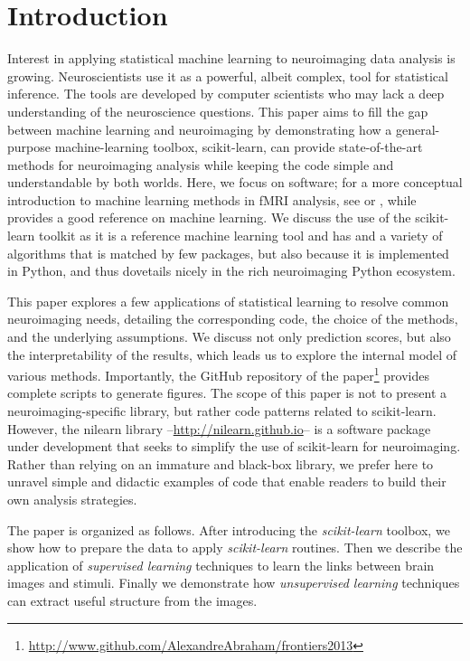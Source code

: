 \documentclass{frontiersSCNS} %
\begin{document}
\section{Introduction}
Interest in applying statistical machine learning to neuroimaging data analysis
is growing. Neuroscientists use it as a powerful, albeit complex, tool for
statistical inference. The tools are developed by
computer scientists who may lack a deep understanding of the
neuroscience questions. This paper
aims to fill the gap between machine learning and neuroimaging by demonstrating
how a general-purpose machine-learning toolbox, scikit-learn, can
provide state-of-the-art methods for neuroimaging analysis while keeping
the code simple and
understandable by both worlds. Here, we focus on software; for a 
more conceptual introduction to machine learning methods in fMRI analysis,
see \cite{pereira2009} or \cite{mur2009}, while \cite{hastie2001}
provides a good reference on machine learning.
We discuss the use of the scikit-learn toolkit as it is a reference
machine learning tool and has and a variety of algorithms that is matched by few
packages,
but also because it is implemented in Python,
and thus dovetails nicely in the rich neuroimaging Python ecosystem.

This paper explores a few applications of statistical learning to
resolve common neuroimaging needs, detailing the corresponding code,
the choice of the methods, and the underlying assumptions. We discuss not only
prediction scores, but also the interpretability of the results, which
leads us to explore the internal model of various methods. 
Importantly, the GitHub repository of the
paper\footnote{\url{http://www.github.com/AlexandreAbraham/frontiers2013}}
provides complete scripts to generate figures. 
The scope of this paper is not to present a neuroimaging-specific library,
but rather
code patterns related to scikit-learn. However, the nilearn library --\url{http://nilearn.github.io}-- is a software
package under development
that seeks to simplify the use of scikit-learn for neuroimaging. Rather
than relying on an immature and black-box library, we prefer here to
unravel simple and didactic examples of code that enable readers to
build their own analysis strategies.

The paper is organized as
follows. After introducing the \emph{scikit-learn} toolbox, we show 
how to prepare the data to apply
\emph{scikit-learn} routines. Then we describe the application of \emph{supervised
learning} techniques to learn the links between brain images and
stimuli. Finally we demonstrate how \emph{unsupervised learning}
techniques can extract useful structure from the images.
\end{document}
